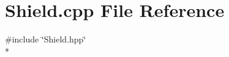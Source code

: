 \section{Shield.\-cpp File Reference}
\label{_shield_8cpp}
{\ttfamily \#include \char`\"{}Shield.\-hpp\char`\"{}}\\*
